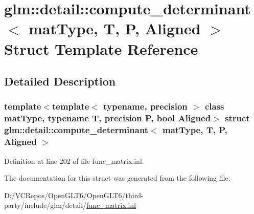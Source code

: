 \hypertarget{structglm_1_1detail_1_1compute__determinant}{}\section{glm\+::detail\+::compute\+\_\+determinant$<$ mat\+Type, T, P, Aligned $>$ Struct Template Reference}
\label{structglm_1_1detail_1_1compute__determinant}


\subsection{Detailed Description}
\subsubsection*{template$<$template$<$ typename, precision $>$ class mat\+Type, typename T, precision P, bool Aligned$>$\newline
struct glm\+::detail\+::compute\+\_\+determinant$<$ mat\+Type, T, P, Aligned $>$}



Definition at line 202 of file func\+\_\+matrix.\+inl.



The documentation for this struct was generated from the following file\+:\begin{DoxyCompactItemize}
\item 
D\+:/\+V\+C\+Repos/\+Open\+G\+L\+T6/\+Open\+G\+L\+T6/third-\/party/include/glm/detail/\mbox{\hyperlink{func__matrix_8inl}{func\+\_\+matrix.\+inl}}\end{DoxyCompactItemize}
